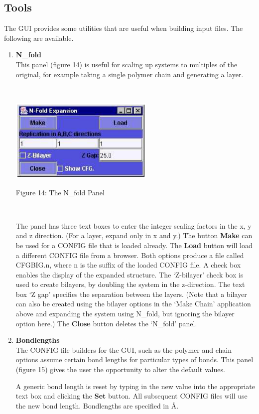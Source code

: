 \subsection{Tools}
The GUI provides some utilities that are useful when building \DD{} input files.
The following are available.
\begin{enumerate}
\item {\bf N\_fold} \\
This panel (figure 14) is useful for scaling up systems to multiples of the
original, for example taking a single polymer chain and generating a
layer.

~

\vskip 5mm
\centerline{\includegraphics[height=4cm]{nfold.ps}}
\centerline{Figure 14: The N\_fold Panel}
\vskip 5mm

~

\noindent
The panel has three text boxes to enter the integer scaling factors in
the x, y and z direction. (For a layer, expand only in x and y.) The
button {\bf Make} can be used for a CONFIG file that is loaded
already. The {\bf Load} button will load a different CONFIG file from
a browser. Both options produce a file called CFGBIG.n, where n is the
suffix of the loaded CONFIG file. A check box enables the display of
the expanded structure. The `Z-bilayer' check box is used to create
bilayers, by doubling the system in the z-direction. The text box `Z
gap' specifies the separation between the layers. (Note that a bilayer
can also be created using the bilayer options in the `Make Chain'
application above and expanding the system using N\_fold, but ignoring the
bilayer option here.) The {\bf Close} button deletes the `N\_fold' panel.

\item {\bf Bondlengths} \\
The CONFIG file builders for the GUI, such as the polymer and chain
options assume certain bond lengths for particular types of
bonds. This panel (figure 15) gives the user the opportunity to alter
the default values.

A generic bond length is reset by typing in the new value into the
appropriate text box and clicking the {\bf Set} button. All subsequent
CONFIG files will use the new bond length. Bondlengths are specified
in \AA. 


\end{enumerate}
